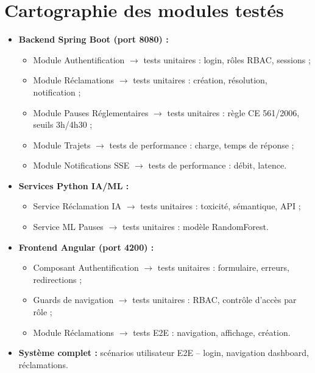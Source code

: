 \documentclass[12pt,a4paper]{report}
\begin{document}
\section{Cartographie des modules testés}
\label{sec:ch9-cartographie}

\begin{itemize}
  \item \textbf{Backend Spring Boot (port 8080) :}
    \begin{itemize}
      \item Module Authentification $\rightarrow$ tests unitaires :
      login, rôles RBAC, sessions ;
      \item Module Réclamations $\rightarrow$ tests unitaires : création,
      résolution, notification ;
      \item Module Pauses Réglementaires $\rightarrow$ tests unitaires :
      règle CE 561/2006, seuils 3h/4h30 ;
      \item Module Trajets $\rightarrow$ tests de performance : charge,
      temps de réponse ;
      \item Module Notifications SSE $\rightarrow$ tests de performance :
      débit, latence.
    \end{itemize}
  \item \textbf{Services Python IA/ML :}
    \begin{itemize}
      \item Service Réclamation IA $\rightarrow$ tests unitaires :
      toxicité, sémantique, API ;
      \item Service ML Pauses $\rightarrow$ tests unitaires : modèle
      RandomForest.
    \end{itemize}
  \item \textbf{Frontend Angular (port 4200) :}
    \begin{itemize}
      \item Composant Authentification $\rightarrow$ tests unitaires :
      formulaire, erreurs, redirections ;
      \item Guards de navigation $\rightarrow$ tests unitaires : RBAC,
      contrôle d'accès par rôle ;
      \item Module Réclamations $\rightarrow$ tests E2E : navigation,
      affichage, création.
    \end{itemize}
  \item \textbf{Système complet :} scénarios utilisateur E2E -- login,
  navigation dashboard, réclamations.
\end{itemize}
\end{document}
